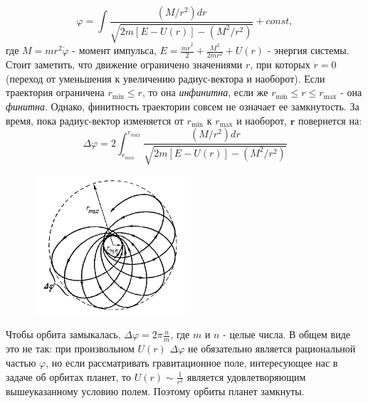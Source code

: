 \documentclass{article}
\begin{document}
\begin{equation}\label{eq5}
\varphi = \int \frac{(M/r^2)dr}{\sqrt{2m[E-U(r)] - (M^2/r^2)}} + const,
\end{equation}
где $M = mr^2\dot{\varphi}$ - момент импульса, $E = \frac{m\dot{r}^2}{2} + \frac{M^2}{2mr^2} + U(r)$ - энергия системы.
Стоит заметить, что движение ограничено значениями $r$, при которых $\dot{r} = 0$ (переход от уменьшения к увеличению радиус-вектора и наоборот). Если траектория ограничена $r_\text{min} \leq r$, то она \textit{инфинитна}, если же $r_\text{min} \leq r \leq r_\text{max}$ - она \textit{финитна}. Однако, финитность траектории совсем не означает ее замкнутость. За время, пока радиус-вектор изменяется от $r_\text{min}$ к $r_\text{max}$ и наоборот, $\textbf{r}$ повернется на:
\begin{equation}\label{eq6}
\Delta \varphi = 2 \int_{r_{min}}^{r_{max}} \frac{(M/r^2)dr}{\sqrt{2m[E-U(r)] - (M^2/r^2)}}  
\end{equation}


\begin{figure}[H]
        \centering
        \includegraphics[width=0.5\textwidth]{1.jpg}
\end{figure}
Чтобы орбита замыкалась, $\Delta \varphi = 2\pi \frac{n}{m}$, где $m$ и $n$ - целые числа. В общем виде это не так: при произвольном $U(r)$ $\Delta \varphi$ не обязательно является рациональной частью $\varphi$, но если рассматривать гравитационное поле, интересующее нас в задаче об орбитах планет, то $U(r) \sim \frac{1}{r^2}$ является удовлетворяющим вышеуказанному условию полем. Поэтому орбиты планет замкнуты.
\end{document}
